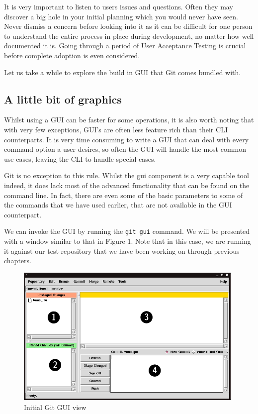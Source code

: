 It is very important to listen to users issues and questions.  Often they may discover a big hole in your initial planning which you would never have seen.  Never dismiss a concern before looking into it as it can be difficult for one person to understand the entire process in place during development, no matter how well documented it is.  Going through a period of User Acceptance Testing is crucial before complete adoption is even considered.

Let us take a while to explore the build in GUI that Git comes bundled with.

\subsection{A little bit of graphics}
Whilst using a GUI can be faster for some operations, it is also worth noting that with very few exceptions, GUI's are often less feature rich than their CLI counterparts.  It is very time consuming to write a GUI that can deal with every command option a user desires, so often the GUI will handle the most common use cases, leaving the CLI to handle special cases.

Git is no exception to this rule.  Whilst the gui component is a very capable tool indeed, it does lack most of the advanced functionality that can be found on the command line.  In fact, there are even some of the basic parameters to some of the commands that we have used earlier, that are not available in the GUI counterpart.

We can invoke the GUI by running the \texttt{git gui} command.  We will be presented with a window similar to that in Figure 1.  Note that in this case, we are running it against our test repository that we have been working on through previous chapters.

\begin{figure}[hbt]
\centering
\includegraphics[width=11cm]{images/f-w5-d1.png}
\caption{Initial Git GUI view}
\end{figure}

